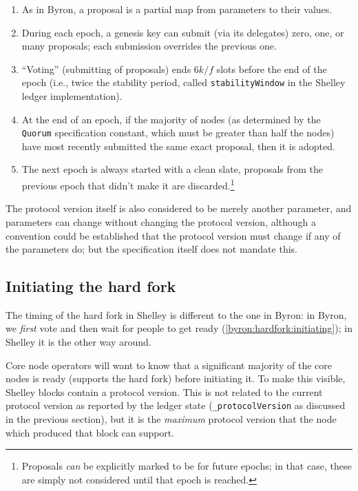 \begin{enumerate}

\item
As in Byron, a proposal is a partial map from parameters to their values.

\item
During each epoch, a genesis key can submit (via its delegates) zero, one, or
many proposals; each submission overrides the previous one.

\item
``Voting'' (submitting of proposals) ends $6k/f$ slots before the end of the
epoch (i.e., twice the stability period, called \lstinline!stabilityWindow! in
the Shelley ledger implementation).

\item
At the end of an epoch, if the majority of nodes (as determined by the
\lstinline!Quorum! specification constant, which must be greater than half the
nodes) have most recently submitted the same exact proposal, then it is adopted.

\item
The next epoch is always started with a clean slate, proposals from the
previous epoch that didn't make it are discarded.\footnote{Proposals \emph{can}
be explicitly marked to be for future epochs; in that case, these are simply
not considered until that epoch is reached.}

\end{enumerate}

The protocol version itself is also considered to be merely another parameter,
and parameters can change without changing the protocol version, although a
convention could be established that the protocol version must change if any of
the parameters do; but the specification itself does not mandate this.

\subsection{Initiating the hard fork}
\label{shelley:hardfork:initiating}

The timing of the hard fork in Shelley is different to the one in Byron: in
Byron, we \emph{first} vote and then wait for people to get ready
(\cref{byron:hardfork:initiating}); in Shelley it is the other way around.

Core node operators will want to know that a significant majority of the core
nodes is ready (supports the hard fork) before initiating it. To make this
visible, Shelley blocks contain a protocol version. This is not related to the
current protocol version as reported by the ledger state
(\lstinline!_protocolVersion! as discussed in the previous section), but it is
the \emph{maximum} protocol version that the node which produced that block can
support.


